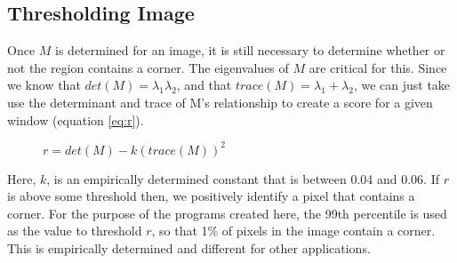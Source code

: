 \documentclass{article}
\begin{document}
\subsection{Thresholding Image}
Once \( M \) is determined for an image, it is still necessary to determine whether or not the region contains a corner. The eigenvalues of \( M \) are critical for this. Since we know that \( det(M) = \lambda_{1}\lambda_{2} \), and that \( trace(M) = \lambda_{1} + \lambda_{2} \), we can just take use the determinant and trace of M's relationship to create a score for a given window (equation \ref{eq:r}).

\begin{figure}[h]
\( r = det(M) - k(trace(M))^{2} \)
\end{figure}

Here, \( k \), is an empirically determined constant that is between 0.04 and 0.06. If \( r \) is above some threshold then, we positively identify a pixel that contains a corner. For the purpose of the programs created here, the 99th percentile is used as the value to threshold \( r \), so that 1\% of pixels in the image contain a corner. This is empirically determined and different for other applications.
\end{document}
